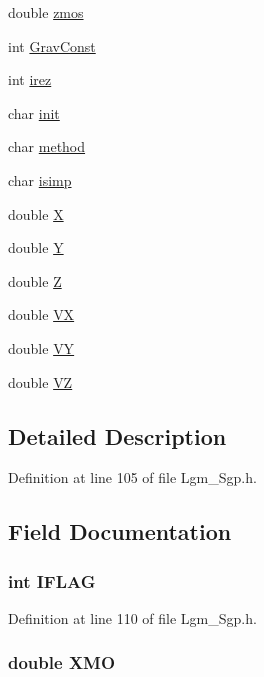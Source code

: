 \begin{CompactItemize}
double \hyperlink{struct___sgp_info_1840b955ac5e5eb7d015f46051df589f}{zmos}
\item 
int \hyperlink{struct___sgp_info_a69491b0e6ccf4560cce706b1e089e24}{GravConst}
\item 
int \hyperlink{struct___sgp_info_2d01b296d1d4611e60cda302675ef46e}{irez}
\item 
char \hyperlink{struct___sgp_info_6a9691d2260a0c4c1a531b79d708520a}{init}
\item 
char \hyperlink{struct___sgp_info_e16a2e07e3ca49c3c4bd592efbf1b5ed}{method}
\item 
char \hyperlink{struct___sgp_info_633c6d59b92dbf5b830ea47a87b9fc96}{isimp}
\item 
double \hyperlink{struct___sgp_info_1059b82f84827fc49ea81b12566b3cdb}{X}
\item 
double \hyperlink{struct___sgp_info_c8d59bf77d5ef21e7c7a88b08f14c825}{Y}
\item 
double \hyperlink{struct___sgp_info_0f16a8f561453187897f0820186da39b}{Z}
\item 
double \hyperlink{struct___sgp_info_7a2579ee60469b7dc5ac77b902d71fa5}{VX}
\item 
double \hyperlink{struct___sgp_info_f7687d7aef9103def7b09bcb5d568e04}{VY}
\item 
double \hyperlink{struct___sgp_info_b9b9161b8168f9424231c7fc59837f88}{VZ}
\end{CompactItemize}


\subsection{Detailed Description}


Definition at line 105 of file Lgm\_\-Sgp.h.

\subsection{Field Documentation}
\hypertarget{struct___sgp_info_686aa728d7bead181dc3ac3a0832502f}{
\subsubsection[{IFLAG}]{\setlength{\rightskip}{0pt plus 5cm}int {\bf IFLAG}}}
\label{struct___sgp_info_686aa728d7bead181dc3ac3a0832502f}




Definition at line 110 of file Lgm\_\-Sgp.h.\hypertarget{struct___sgp_info_b8bbf06d285fc56edffbc353b8e1acf6}{
\subsubsection[{XMO}]{\setlength{\rightskip}{0pt plus 5cm}double {\bf XMO}}}
\label{struct___sgp_info_b8bbf06d285fc56edffbc353b8e1acf6}




